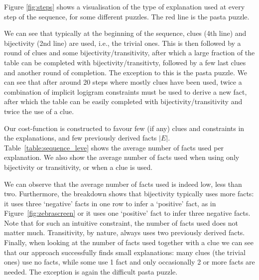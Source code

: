 Figure \ref{fig:steps} shows a visualisation of the type of explanation used at every step of the sequence, for some different puzzles.
The red line is the pasta puzzle. 

We can see that typically at the beginning of the sequence, clues (4th line) and bijectivity (2nd line) are used, i.e., the trivial ones.
This is then followed by a round of clues and some bijectivity/transitivity, after which a large fraction of the table can be completed with bijectivity/transitivty, followed by a few last clues and another round of completion.
The exception to this is the pasta puzzle.
We can see that after around 20 steps where mostly clues have been used, twice a combination of implicit logigram constraints must be used to derive a new fact, after which the table can be easily completed with bijectivity/transitivity and twice the use of a clue.


Our cost-function is constructed to favour few (if any) clues and constraints in the explanations, and few previously derived facts $|E|$.
Table~\ref{table:sequence_leve} shows the average number of facts used per explanation. We also show the average number of facts used when using only bijectivity or transitivity, or when a clue is used.

We can observe that the average number of facts used is indeed low, less than two.
Furthermore, the breakdown shows that bijectivity typically uses more facts: it uses three `negative' facts in one row to infer a `positive' fact, as in Figure~\ref{fig:zebrascreen} or it uses one `positive' fact to infer three negative facts.
Note that for such an intuitive constraint, the number of facts used does not matter much.
Transitivity, by nature, always uses two previously derived facts.
Finally, when looking at the number of facts used together with a clue we can see that our approach successfully finds small explanations: many clues (the trivial ones) use no facts, while some use 1 fact and only occasionally 2 or more facts are needed.
The exception is again the difficult pasta puzzle.


